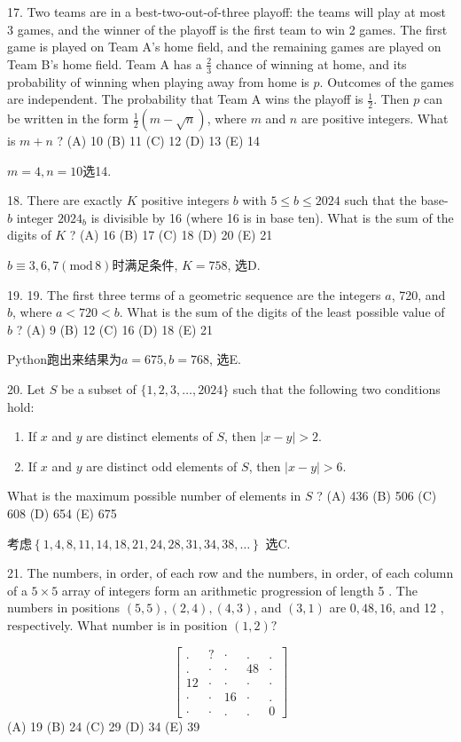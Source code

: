 \documentclass[12pt,a4paper]{article}
\newcommand{\bbrace}[1]{\left\{ #1 \right\} }
\renewcommand{\mod}[1]{(\text{mod}\,#1)}
\newenvironment{enu}{\begin{enumerate}[(1)]}{\end{enumerate}}
\theoremstyle{definition}
\begin{document}
17. Two teams are in a best-two-out-of-three playoff: the teams will play at most 3 games, and the winner of the playoff is the first team to win 2 games. The first game is played on Team A's home field, and the remaining games are played on Team B's home field. Team A has a $\frac{2}{3}$ chance of winning at home, and its probability of winning when playing away from home is $p$. Outcomes of the games are independent. The probability that Team A wins the playoff is $\frac{1}{2}$. Then $p$ can be written in the form $\frac{1}{2}(m-\sqrt{n})$, where $m$ and $n$ are positive integers. What is $m+n$ ?
(A) 10
(B) 11
(C) 12
(D) 13
(E) 14

$m=4,n=10$选14. 

18. There are exactly $K$ positive integers $b$ with $5 \leq b \leq 2024$ such that the base- $b$ integer $2024_b$ is divisible by 16 (where 16 is in base ten). What is the sum of the digits of $K$ ?
(A) 16
(B) 17
(C) 18
(D) 20
(E) 21

$b\equiv 3,6,7\mod{8}$时满足条件, $K=758$, 选D. 

19. 19. The first three terms of a geometric sequence are the integers $a$, 720, and $b$, where $a<720<b$. What is the sum of the digits of the least possible value of $b$ ?
(A) 9
(B) 12
(C) 16
(D) 18
(E) 21

Python跑出来结果为$a=675, b=768$, 选E. 

20. Let $S$ be a subset of $\{1,2,3, \ldots, 2024\}$ such that the following two conditions hold:
\begin{enu} 
\item If $x$ and $y$ are distinct elements of $S$, then $|x-y|>2$.
\item If $x$ and $y$ are distinct odd elements of $S$, then $|x-y|>6$.
\end{enu}
What is the maximum possible number of elements in $S$ ?
(A) 436
(B) 506
(C) 608
(D) 654
(E) 675

考虑$\bbrace{1,4,8,11,14,18,21,24,28,31,34,38,\dots}$
选C.

21. The numbers, in order, of each row and the numbers, in order, of each column of a $5 \times 5$ array of integers form an arithmetic progression of length 5 . The numbers in positions $(5,5),(2,4),(4,3)$, and $(3,1)$ are $0,48,16$, and 12 , respectively. What number is in position $(1,2) ?$

$$
\left[\begin{array}{ccccc}
. & ? & \cdot & . & . \\
. & \cdot & \cdot & 48 & \cdot \\
12 & \cdot & \cdot & \cdot & \cdot \\
\cdot & \cdot & 16 & \cdot & . \\
\cdot & \cdot & . & . & 0
\end{array}\right]
$$
(A) 19
(B) 24
(C) 29
(D) 34
(E) 39
\end{document}
